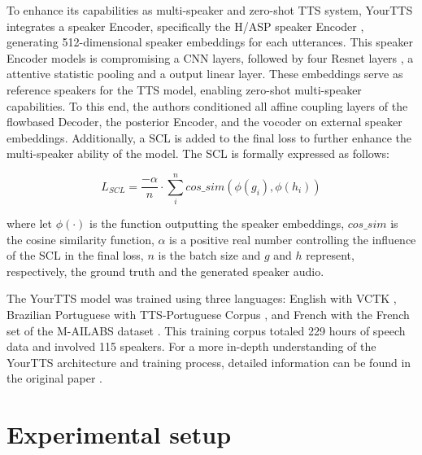To enhance its capabilities as multi-speaker and zero-shot \ac{TTS} system, YourTTS integrates a speaker Encoder, specifically the \ac{H/ASP} speaker Encoder \cite{heo2020clova}, generating 512-dimensional speaker embeddings for each utterances. This speaker Encoder models is compromising a \ac{CNN} layers, followed by four Resnet layers \cite{targ2016resnet}, a attentive statistic pooling and a output linear layer. These embeddings serve as reference speakers for the \ac{TTS} model, enabling zero-shot multi-speaker capabilities. To this end, the authors conditioned all affine coupling layers of the flowbased Decoder, the posterior Encoder, and the vocoder on external speaker embeddings. Additionally, a \ac{SCL} is added to the final loss to further enhance the multi-speaker ability of the model. The \ac{SCL} is formally expressed as follows:

\begin{equation}
    L_{SCL} = \frac{-\alpha}{n} \cdot \sum_{i}^{n} cos\_sim(\phi(g_i), \phi(h_i))
\end{equation}

where let $\phi(\cdot)$ is the function outputting the speaker embeddings, $cos\_sim$ is the cosine similarity function, $\alpha$ is a positive real number controlling the influence of the \ac{SCL} in the final loss, $n$ is the batch size and $g$ and $h$ represent, respectively, the ground truth and the generated speaker audio.

The YourTTS model was trained using three languages: English with VCTK \cite{veaux2016superseded}, Brazilian Portuguese with TTS-Portuguese Corpus \cite{casanova2022tts}, and French with the French set of the M-AILABS dataset \cite{mailabs}. This training corpus totaled 229 hours of speech data and involved 115 speakers. For a more in-depth understanding of the YourTTS architecture and training process, detailed information can be found in the original paper \cite{casanova2022yourtts}.


\section{Experimental setup}
\label{section:methods}


